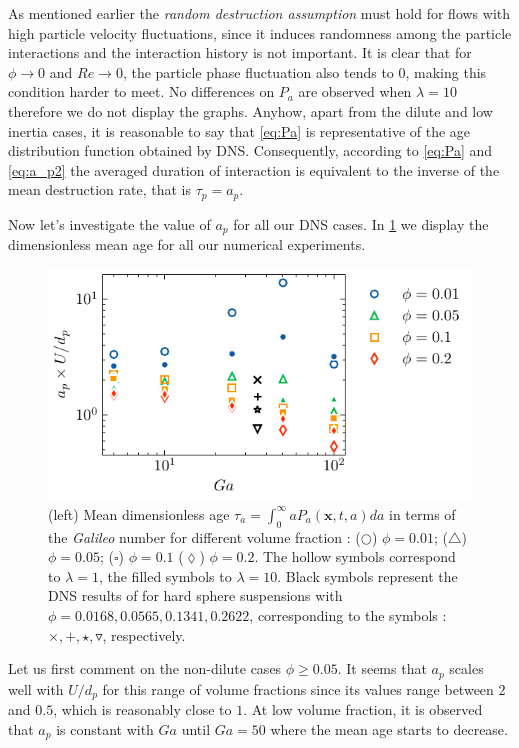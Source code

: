 As mentioned earlier the \textit{random destruction assumption} must hold for flows with high particle velocity fluctuations, since it induces randomness among the particle interactions \citep{zhang2023evolution} and the interaction history is not important.  
It is clear that for $\phi \to 0$ and $Re \to 0$, the particle phase fluctuation also tends to $0$, making this condition harder to meet. 
No differences on $P_a$ are observed when $\lambda = 10 $ therefore we do not display the graphs. 
Anyhow, apart from the dilute and low inertia cases, it is reasonable to say that \ref{eq:Pa} is representative of the age distribution function obtained by DNS.
Consequently, according to \ref{eq:Pa} and \ref{eq:a_p2} the averaged duration of interaction is equivalent to the inverse of the mean destruction rate, that is $\tau_p = a_p$. 

Now let's investigate the value of $a_p$ for all our DNS cases. 
In \ref{fig:tau_p} we display the dimensionless mean age for all our numerical experiments. 
\begin{figure}[h!]
    \centering
    \includegraphics[height = 0.3\textwidth]{image/HOMOGENEOUS_NEW/PA/age.pdf}
    \caption{
    (left) Mean dimensionless age $\tau_a =  \int_0^\infty aP_a(\textbf{x},t,a)da$ in terms of the \textit{Galileo} number for different volume fraction :   
    ($\pmb\bigcirc$) $\phi = 0.01$; ($\pmb\triangle$) $ \phi = 0.05$; ($\pmb\square$) $\phi = 0.1$ ($\pmb\lozenge$) $\phi = 0.2$.
    The hollow symbols correspond to $\lambda = 1$, the filled symbols to $\lambda = 10$.
    Black symbols represent the DNS results of \citet{zhang2023evolution} for hard sphere suspensions with $\phi = 0.0168,0.0565,0.1341,0.2622$, corresponding to the symbols : $\pmb\times, \pmb +, \pmb\star , \pmb\triangledown$, respectively.
    }
    \label{fig:tau_p}
\end{figure}
Let us first comment on the non-dilute cases $\phi\geq 0.05$. 
It seems that $a_p$ scales well with $U/d_p$ for this range of volume fractions since its values range between $2$ and $0.5$, which is reasonably close to $1$. 
At low volume fraction, it is observed that $a_p$ is constant with $Ga$ until $Ga = 50$ where the mean age starts to decrease. 


